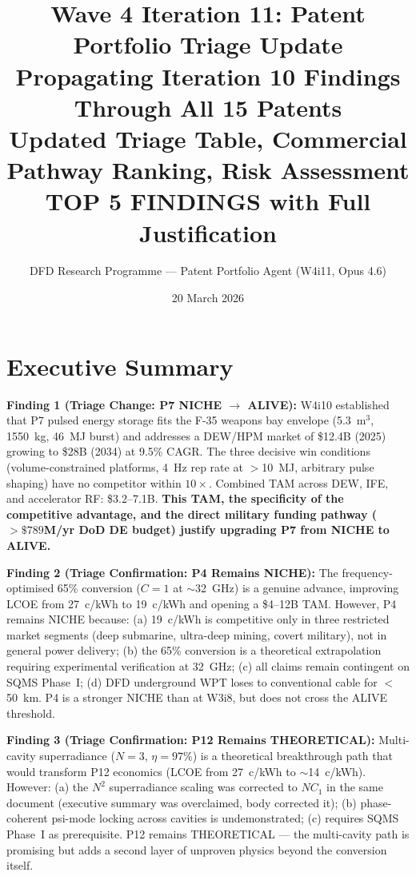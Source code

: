 \documentclass[11pt]{article}
\title{\textbf{Wave 4 Iteration 11: Patent Portfolio Triage Update}\\[8pt]
{\large Propagating Iteration 10 Findings Through All 15 Patents}\\[4pt]
{\large Updated Triage Table, Commercial Pathway Ranking, Risk Assessment}\\[4pt]
{\normalsize TOP 5 FINDINGS with Full Justification}}
\author{DFD Research Programme --- Patent Portfolio Agent (W4i11, Opus 4.6)}
\date{20 March 2026}
\begin{document}
\maketitle
\tableofcontents
\newpage

\section*{Executive Summary}

\begin{tcolorbox}[colback=blue!5!white, colframe=blue!60!black,
  title=\textbf{W4i11: Five Key Findings}]

\textbf{Finding 1 (Triage Change: P7 NICHE $\to$ ALIVE):}
W4i10 established that P7 pulsed energy storage fits the F-35 weapons bay
envelope (5.3~m$^3$, 1550~kg, 46~MJ burst) and addresses a DEW/HPM market
of \$12.4B (2025) growing to \$28B (2034) at 9.5\% CAGR. The three
decisive win conditions (volume-constrained platforms, 4~Hz rep rate at
$>$10~MJ, arbitrary pulse shaping) have no competitor within $10\times$.
Combined TAM across DEW, IFE, and accelerator RF: \$3.2--7.1B.
\textbf{This TAM, the specificity of the competitive advantage, and the
direct military funding pathway ($>\$789$M/yr DoD DE budget) justify
upgrading P7 from NICHE to ALIVE.}

\textbf{Finding 2 (Triage Confirmation: P4 Remains NICHE):}
The frequency-optimised 65\% conversion ($C = 1$ at $\sim$32~GHz) is a
genuine advance, improving LCOE from 27~c/kWh to 19~c/kWh and opening a
\$4--12B TAM. However, P4 remains NICHE because: (a) 19~c/kWh is
competitive only in three restricted market segments (deep submarine,
ultra-deep mining, covert military), not in general power delivery;
(b) the 65\% conversion is a theoretical extrapolation requiring
experimental verification at 32~GHz; (c) all claims remain contingent
on SQMS Phase~I; (d) DFD underground WPT loses to conventional cable
for $<$50~km. P4 is a stronger NICHE than at W3i8, but does not
cross the ALIVE threshold.

\textbf{Finding 3 (Triage Confirmation: P12 Remains THEORETICAL):}
Multi-cavity superradiance ($N = 3$, $\eta = 97\%$) is a theoretical
breakthrough path that would transform P12 economics (LCOE from 27~c/kWh
to $\sim$14~c/kWh). However: (a) the $N^2$ superradiance scaling was
corrected to $NC_1$ in the same document (executive summary was
overclaimed, body corrected it); (b) phase-coherent psi-mode locking
across cavities is undemonstrated; (c) requires SQMS Phase~I as
prerequisite. P12 remains THEORETICAL --- the multi-cavity path is
promising but adds a second layer of unproven physics beyond the
conversion itself.


\end{tcolorbox}
\end{document}
